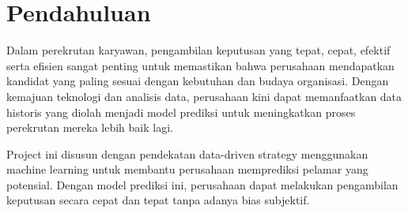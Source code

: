 \section{Pendahuluan}

Dalam perekrutan karyawan, pengambilan keputusan yang tepat, cepat, efektif serta efisien sangat penting untuk memastikan bahwa perusahaan mendapatkan kandidat yang paling sesuai dengan kebutuhan dan budaya organisasi. Dengan kemajuan teknologi dan analisis data, perusahaan kini dapat memanfaatkan data historis yang diolah menjadi model prediksi untuk meningkatkan proses perekrutan mereka lebih baik lagi. 

Project ini disusun dengan pendekatan data-driven strategy menggunakan machine learning untuk membantu perusahaan memprediksi pelamar yang potensial. Dengan model prediksi ini, perusahaan dapat melakukan pengambilan keputusan secara cepat dan tepat tanpa adanya bias subjektif.





